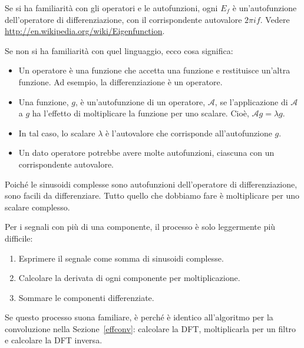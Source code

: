 \documentclass[12pt,a4paper]{book}
\begin{document}
Se si ha familiarità con gli operatori e le autofunzioni, ogni $E_f$ è un'autofunzione dell'operatore di differenziazione, con il corrispondente autovalore $2 \pi i f$. Vedere \url{http://en.wikipedia.org/wiki/Eigenfunction}.

Se non si ha familiarità con quel linguaggio, ecco cosa significa:

\newcommand{\op}{\mathcal{A}}

\begin{itemize} 

\item Un operatore è una funzione che accetta una funzione e restituisce un'altra funzione. Ad esempio, la differenziazione è un operatore.

\item Una funzione, $g$, è un'autofunzione di un operatore, $\op$, se l'applicazione di $\op$ a $g$ ha l'effetto di moltiplicare la funzione per uno scalare. Cioè, $\op g = \lambda g$.

\item In tal caso, lo scalare $\lambda$ è l'autovalore che corrisponde all'autofunzione $g$.

\item Un dato operatore potrebbe avere molte autofunzioni, ciascuna con un corrispondente autovalore.

\end{itemize} 

Poiché le sinusoidi complesse sono autofunzioni dell'operatore di differenziazione, sono facili da differenziare. Tutto quello che dobbiamo fare è moltiplicare per uno scalare complesso.

Per i segnali con più di una componente, il processo è solo leggermente più difficile:

\begin{enumerate} 

\item Esprimere il segnale come somma di sinusoidi complesse.

\item Calcolare la derivata di ogni componente per moltiplicazione.

\item Sommare le componenti differenziate.

\end{enumerate} 

Se questo processo suona familiare, è perché è identico all'algoritmo per la convoluzione nella Sezione~\ref{effconv}: calcolare la DFT, moltiplicarla per un filtro e calcolare la DFT inversa.
\end{document}
